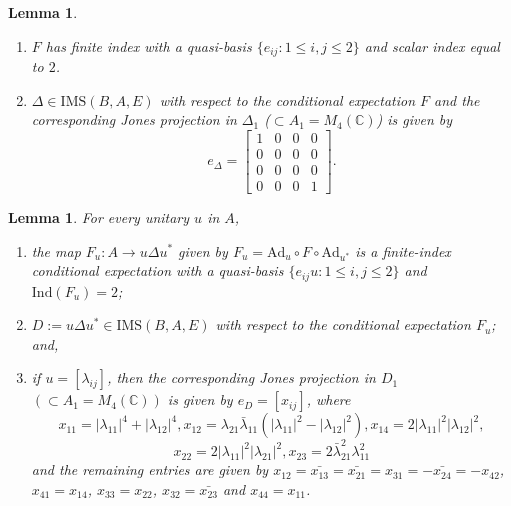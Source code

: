 \documentclass[a4]{amsart}
\newtheorem{lemma}[theorem]{\bf Lemma}
\numberwithin{equation}{section}
\newcommand{\C}{\mathbb{C}}
\begin{document}
\begin{lemma}\label{E-F-finite-index}
  \begin{enumerate}
   \item $F$ has finite index with a  quasi-basis
     $\{ e_{ij} : 1\leq i,j \leq 2\}$  and scalar index equal to $2$. \smallskip
     \item $\Delta \in \mathrm{IMS}(B, A, E)$ with
      respect to the conditional expectation $F$ and the corresponding Jones projection in $\Delta_1$ ($\subset A_1 =M_4(\C)$) is given by
      \[
      e_\Delta = \begin{bmatrix}
  	1 & 0 & 0 & 0\\ 0 & 0 & 0 & 0\\ 0 & 0 & 0 & 0\\ 0 & 0 & 0 & 1 
      \end{bmatrix}.
      \]
  \end{enumerate}
\end{lemma}

\begin{lemma}\label{conjugate}
For every unitary $u$ in $A$,
  \begin{enumerate}
      \item    the map
   $F_u: A
\to u \Delta u^*$ given by
\(
F_u= \mathrm{Ad}_{u} \circ F \circ
\mathrm{Ad}_{u^*}
\) is a finite-index conditional expectation with a quasi-basis
\(
\{ e_{ij}u : 1\leq i,j \leq 2\}\)
and $\mathrm{Ind}(F_u) = 2 $; 
\item $D:=u\Delta u^* \in \mathrm{IMS}(B, A, E)$ with respect to the
  conditional expectation $F_u$; and,
  \item if $ u = [\lambda_{ij}] $, then
  the corresponding Jones projection in $D_1$ $(\subset A_1=M_4(\C))$ is given by
  $e_D=[x_{ij}]$, where
\[
     x_{11}   =  |\lambda_{11}|^4 + |\lambda_{12}|^4
     , x_{12}  =  \lambda_{21}
     \bar{\lambda}_{11}(|\lambda_{11}|^2 - |\lambda_{12}|^2),
     x_{14}      =  2|\lambda_{11}|^2 |\lambda_{12}|^2,
     \]
     \[x_{22} =
        2|\lambda_{11}|^2 |\lambda_{21}|^2,
     x_{23}  =   2 \bar{\lambda}_{21}^2 \lambda_{11}^2
   \]
and the remaining entries are given by $x_{12} = \bar{x_{13}} = \bar{x_{21}} = {x_{31}} = -\bar {x_{24}} = -
     x_{42}$, $x_{41} =  x_{14} $, $x_{33} = x_{22}$, $x_{32} = \bar{x_{23}}$ and 
     $x_{44} =     x_{11}$.
   \end{enumerate}
  \end{lemma}
\end{document}
